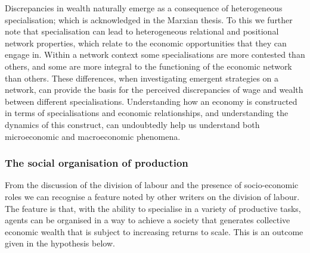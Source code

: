 Discrepancies in wealth naturally emerge as a consequence of heterogeneous specialisation; which is acknowledged in the Marxian thesis. To this we further note that specialisation can lead to heterogeneous relational and positional network properties, which relate to the economic opportunities that they can engage in. Within a network context some specialisations are more contested than others, and some are more integral to the functioning of the economic network than others. These differences, when investigating emergent strategies on a network, can provide the basis for the perceived discrepancies of wage and wealth between different specialisations. Understanding how an economy is constructed in terms of specialisations and economic relationships, and understanding the dynamics of this construct, can undoubtedly help us understand both microeconomic and macroeconomic phenomena.


\subsubsection{The social organisation of production}

From the discussion of the division of labour and the presence of socio-economic roles we can recognise a feature noted by other writers on the division of labour. The feature is that, with the ability to specialise in a variety of productive tasks, agents can be organised in a way to achieve a society that generates collective economic wealth that is subject to increasing returns to scale. This is an outcome given in the hypothesis below.

